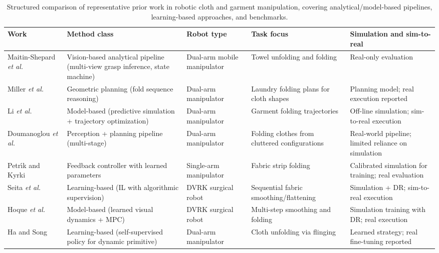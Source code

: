 \begin{table}[htb]
    \centering
    \caption{Structured comparison of representative prior work in robotic cloth and garment manipulation, covering analytical/model-based pipelines, learning-based approaches, and benchmarks.}\label{tab:cloth_related_work_comparison}
    \begin{tabular}{p{} p{} p{} p{} p{}}
    \hline
    \textbf{Work} & \textbf{Method class} & \textbf{Robot type} & \textbf{Task focus} & \textbf{Simulation and sim-to-real} \\
    \hline
    Maitin-Shepard \emph{et al.}~\cite{MaitinShepard2010ClothGrasp} & Vision-based analytical pipeline (multi-view grasp inference, state machine) & Dual-arm mobile manipulator & Towel unfolding and folding & Real-only evaluation \\
    Miller \emph{et al.}~\cite{Miller2012LaundryFolding} & Geometric planning (fold sequence reasoning) & Dual-arm manipulator & Laundry folding plans for cloth shapes & Planning model; real execution reported \\
    Li \emph{et al.}~\cite{Li2015PredictiveFolding} & Model-based (predictive simulation + trajectory optimization) & Dual-arm manipulator & Garment folding trajectories & Off-line simulation; sim-to-real execution \\
    Doumanoglou \emph{et al.}~\cite{Doumanoglou2016FoldingPipeline} & Perception + planning pipeline (multi-stage) & Dual-arm manipulator & Folding clothes from cluttered configurations & Real-world pipeline; limited reliance on simulation \\
    Petr{\'\i}k and Kyrki~\cite{Petrik2019FabricStripFolding} & Feedback controller with learned parameters & Single-arm manipulator & Fabric strip folding & Calibrated simulation for training; real evaluation \\
    Seita \emph{et al.}~\cite{Seita2020FabricSmoothing} & Learning-based (\ac{IL} with algorithmic supervision) & \ac{DVRK} surgical robot & Sequential fabric smoothing/flattening & Simulation + \ac{DR}; sim-to-real execution \\
    Hoque \emph{et al.}~\cite{Hoque2020VisuoSpatialForesight} & Model-based (learned visual dynamics + \ac{MPC}) & \ac{DVRK} surgical robot & Multi-step smoothing and folding & Simulation training with \ac{DR}; real execution \\
    Ha and Song~\cite{Ha2021FlingBot} & Learning-based (self-supervised policy for dynamic primitive) & Dual-arm manipulator & Cloth unfolding via flinging & Learned strategy; real fine-tuning reported \\

\end{tabular}
\end{table}
